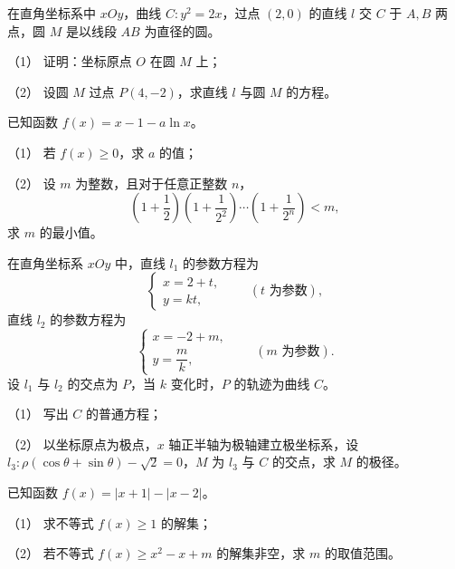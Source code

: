 \begin{question}
在直角坐标系中 \(xOy\)，曲线 \(C:y^2=2x\)，过点 \((2,0)\) 的直线 \(l\) 交 \(C\) 于 \(A,B\) 两点，圆 \(M\) 是以线段 \(AB\) 为直径的圆。

   （1） 证明：坐标原点 \(O\) 在圆 \(M\) 上；

   （2） 设圆 \(M\) 过点 \(P(4,-2)\)，求直线 \(l\) 与圆 \(M\) 的方程。

\end{question}
\begin{question}
已知函数 \(f(x)=x-1-a\ln x\)。

   （1） 若 \(f(x)\ge0\)，求 \(a\) 的值；

   （2） 设 \(m\) 为整数，且对于任意正整数 \(n\)，
\nopagebreak[4]
   \[
   \left(1+\frac12\right)\left(1+\frac1{2^2}\right)\cdots\left(1+\frac1{2^n}\right)<m,
   \]
   求 \(m\) 的最小值。

\end{question}
\begin{question}
在直角坐标系 \(xOy\) 中，直线 \(l_1\) 的参数方程为
\nopagebreak[4]
\[
\begin{cases}
x=2+t,\\
y=kt,
\end{cases}\qquad(t\text{ 为参数}),
\]
直线 \(l_2\) 的参数方程为
\nopagebreak[4]
\[
\begin{cases}
x=-2+m,\\
y=\dfrac{m}{k},
\end{cases}\qquad(m\text{ 为参数}).
\]
设 \(l_1\) 与 \(l_2\) 的交点为 \(P\)，当 \(k\) 变化时，\(P\) 的轨迹为曲线 \(C\)。

   （1） 写出 \(C\) 的普通方程；

   （2） 以坐标原点为极点，\(x\) 轴正半轴为极轴建立极坐标系，设 \(l_3:\rho(\cos\theta+\sin\theta)-\sqrt2=0\)，\(M\) 为 \(l_3\) 与 \(C\) 的交点，求 \(M\) 的极径。

\end{question}
\begin{question}
已知函数 \(f(x)=|x+1|-|x-2|\)。

   （1） 求不等式 \(f(x)\ge1\) 的解集；

   （2） 若不等式 \(f(x)\ge x^2-x+m\) 的解集非空，求 \(m\) 的取值范围。

\end{question}